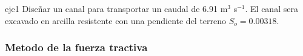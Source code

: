 \documentclass[11pt, oneside]{article}
\begin{document}
\begin{eje}{}{eje1}
Diseñar un canal para transportar un caudal de 6.91 m$^3$ s$^{-1}$. El canal sera excavado en arcilla resistente con una pendiente del terreno $S_o = 0.00318$.
\end{eje}

\subsubsection{Metodo de la fuerza tractiva}
 
 

\end{document}

